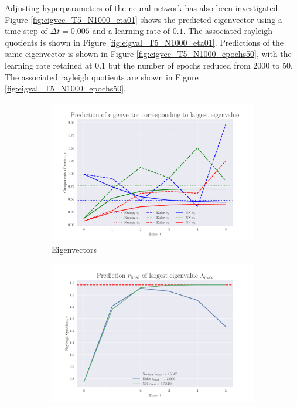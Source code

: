 \documentclass[12pt]{extarticle}
\begin{document}
Adjusting hyperparameters of the neural network has also been investigated. Figure \ref{fig:eigvec_T5_N1000_eta01} shows the predicted eigenvector using a time step of $\Delta t = 0.005$ and a learning rate of $0.1$. The associated rayleigh quotients is shown in Figure \ref{fig:eigval_T5_N1000_eta01}. Predictions of the same eigenvector is shown in Figure \ref{fig:eigvec_T5_N1000_epochs50}, with the learning rate retained at $0.1$ but the number of epochs reduced from $2000$ to $50$. The associated rayleigh quotients are shown in Figure \ref{fig:eigval_T5_N1000_epochs50}.


\begin{figure}[h]
	\centering
	\begin{subfigure}{0.49\textwidth}
		\centering
		\includegraphics[width=\textwidth]{../output/plots/eigvec_T5_N6.pdf}
		\caption{Eigenvectors}
		\label{fig:eigvec_T5_N6}
	\end{subfigure}
	\hfill
	\begin{subfigure}{0.49\textwidth}
		\centering
		\includegraphics[width=\textwidth]{../output/plots/eigval_T5_N6.pdf}

\end{subfigure}
\end{figure}
\end{document}
